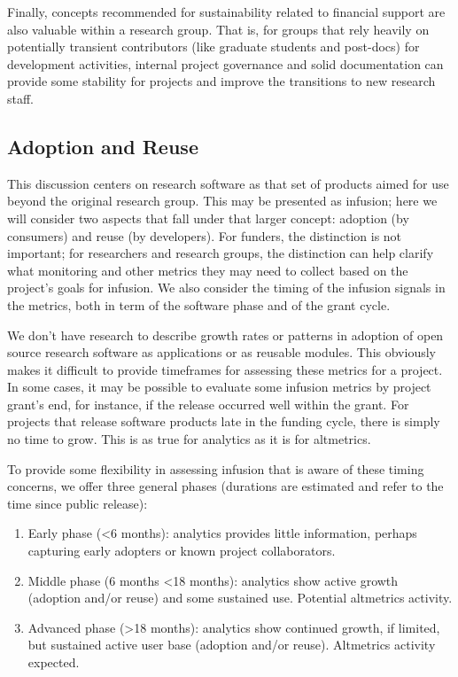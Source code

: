 \documentclass{article}
\begin{document}
Finally, concepts recommended for sustainability related to financial support are also valuable within a research group. That is, for groups that rely heavily on potentially transient contributors (like graduate students and post-docs) for development activities, internal project governance and solid documentation can provide some stability for projects and improve the transitions to new research staff. 

\subsection{Adoption and Reuse}
This discussion centers on research software as that set of products aimed for use beyond the original research group. This may be presented as infusion; here we will consider two aspects that fall under that larger concept: adoption (by consumers) and reuse (by developers). For funders, the distinction is not important; for researchers and research groups, the distinction can help clarify what monitoring and other metrics they may need to collect based on the project’s goals for infusion. We also consider the timing of the infusion signals in the metrics, both in term of the software phase and of the grant cycle. 
 
We don’t have research to describe growth rates or patterns in adoption of open source research software as applications or as reusable modules. This obviously makes it difficult to provide timeframes for assessing these metrics for a project. In some cases, it may be possible to evaluate some infusion metrics by project grant’s end, for instance, if the release occurred well within the grant. For projects that release software products late in the funding cycle, there is simply no time to grow. This is as true for analytics as it is for altmetrics. 
 
To provide some flexibility in assessing infusion that is aware of these timing concerns, we offer three general phases (durations are estimated and refer to the time since public release):
\begin{enumerate}
\item Early phase (\textless 6 months): analytics provides little information, perhaps capturing early adopters or known project collaborators.
\item Middle phase (6 months \textless 18 months): analytics show active growth (adoption and/or reuse) and some sustained use. Potential altmetrics activity.
\item Advanced phase (\textgreater 18 months): analytics show continued growth, if limited, but sustained active user base (adoption and/or reuse). Altmetrics activity expected.
\end{enumerate}
\end{document}
